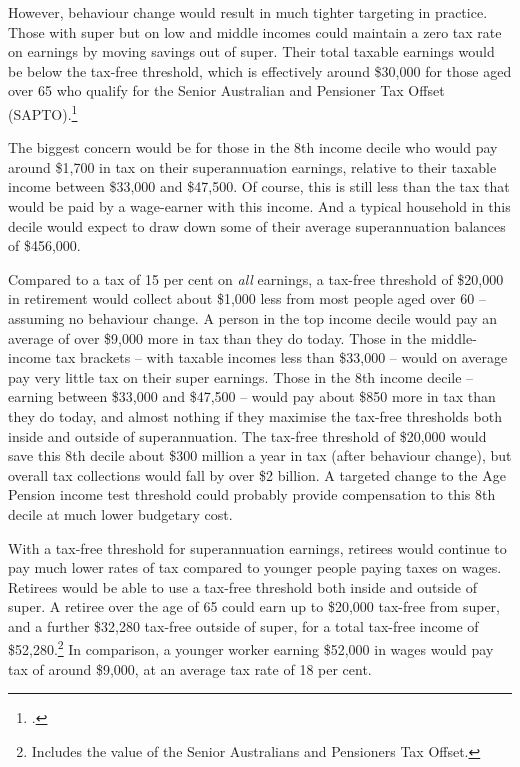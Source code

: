 However, behaviour change would result in much tighter targeting in practice. Those with super but on low and middle incomes could maintain a zero tax rate on earnings by moving savings out of super. Their total taxable earnings would be below the tax-free threshold, which is effectively around \$30,000 for those aged over 65 who qualify for the Senior Australian and Pensioner Tax Offset (SAPTO).\footcite{ATO2015-Beneficiary-tax-offset-sapto-calculator}  

The biggest concern would be for those in the 8th income decile who would pay around \$1,700 in tax on their superannuation earnings, relative to their taxable income between \$33,000 and \$47,500. Of course, this is still less than the tax that would be paid by a wage-earner with this income. And a typical household in this decile would expect to draw down some of their average superannuation balances of \$456,000.

Compared to a tax of 15 per cent on \emph{all} earnings, a tax-free threshold of \$20,000 in retirement would collect about \$1,000 less from most people aged over 60 – assuming no behaviour change. A person in the top income decile would pay an average of over \$9,000 more in tax than they do today. Those in the middle-income tax brackets – with taxable incomes less than \$33,000 – would on average pay very little tax on their super earnings. Those in the 8th income decile – earning between \$33,000 and \$47,500 – would pay about \$850 more in tax than they do today, and almost nothing if they maximise the tax-free thresholds both inside and outside of superannuation. The tax-free threshold of \$20,000 would save this 8th decile about \$300 million a year in tax (after behaviour change), but overall tax collections would fall by over \$2 billion. A targeted change to the Age Pension income test threshold could probably provide compensation to this 8th decile at much lower budgetary cost. 

With a tax-free threshold for superannuation earnings, retirees would continue to pay much lower rates of tax compared to younger people paying taxes on wages. Retirees would be able to use a tax-free threshold both inside and outside of super. A retiree over the age of 65 could earn up to \$20,000 tax-free from super, and a further \$32,280 tax-free outside of super, for a total tax-free income of \$52,280.\footnote{Includes the value of the Senior Australians and Pensioners Tax Offset.} In comparison, a younger worker earning \$52,000 in wages would pay tax of around \$9,000, at an average tax rate of 18 per cent.

